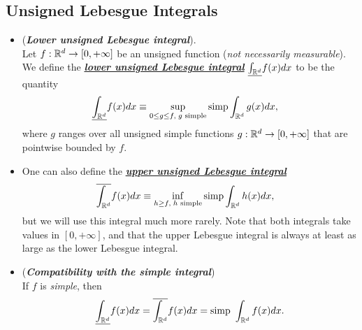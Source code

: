 \documentclass[11pt]{article}
\begin{document}
\subsection{Unsigned Lebesgue Integrals}
\begin{itemize}
\item \begin{definition}(\emph{\textbf{Lower unsigned Lebesgue integral}}). \\
Let $f : {\mathbb R}^d \rightarrow [0,+\infty]$ be an unsigned function (\emph{not necessarily measurable}). We define the \underline{\emph{\textbf{lower unsigned Lebesgue integral}}} $\underline{\int_{{\mathbb R}^{d}}}f(x)dx$ to be the quantity
\begin{align*}
\underline{\int_{{\mathbb R}^{d}}}f(x)dx &\equiv \sup\limits_{0\le g\le f,\; g\text{ simple}} \text{simp}\int_{{\mathbb R}^{d}}g(x) dx,
\end{align*}
where $g$ ranges over all unsigned simple functions $g : {\mathbb R}^d \rightarrow [0,+\infty]$ that are pointwise bounded by $f$.
\end{definition}

\item \begin{remark}
One can also define the \underline{\emph{\textbf{upper unsigned Lebesgue integral}}}
\begin{align*}
\overline{\int_{{\mathbb R}^{d}}}f(x)dx &\equiv \inf\limits_{h\ge f,\; h\text{ simple}} \text{simp}\int_{{\mathbb R}^{d}}h(x) dx,
\end{align*} but we will use this integral much more rarely. Note that both integrals take values in $[0,+\infty]$, and that the upper Lebesgue integral is always at least as large as the lower Lebesgue integral.
\end{remark}

\item \begin{remark} (\emph{\textbf{Compatibility with the simple integral}})\\
 If $f$ is \emph{simple}, then
 \begin{align*}
 \underline{\int_{{\mathbb R}^{d}}}f(x)dx = \overline{\int_{{\mathbb R}^{d}}}f(x)dx = \text{simp }\int_{{\mathbb R}^{d}}f(x)dx.
 \end{align*}
\end{remark}


\end{itemize}
\end{document}
